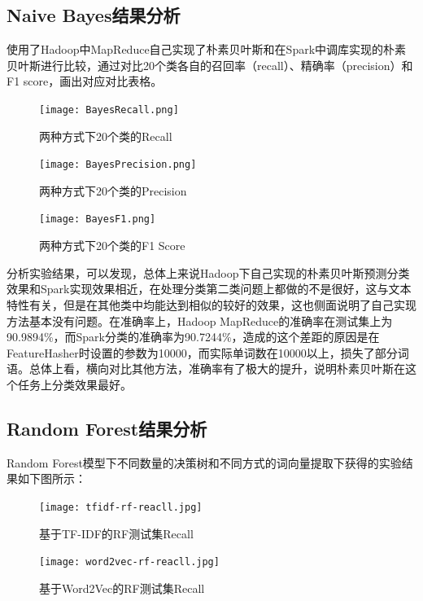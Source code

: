 \documentclass[lang=cn,11pt]{elegantpaper}
\begin{document}
\subsection{Naive Bayes结果分析}
使用了Hadoop中MapReduce自己实现了朴素贝叶斯和在Spark中调库实现的朴素贝叶斯进行比较，通过对比20个类各自的召回率（recall）、精确率（precision）和F1 score，画出对应对比表格。
\begin{figure}[H]
  \begin{minipage}[t]{0.5\linewidth}
  \centering
  \texttt{[image: BayesRecall.png]}
  \caption{两种方式下20个类的Recall \label{fig:BayesRecall}}
  \label{fig:side:a}
  \end{minipage}
  \begin{minipage}[t]{0.5\linewidth}
  \centering
  \texttt{[image: BayesPrecision.png]}
  \caption{两种方式下20个类的Precision \label{fig:BayesPrecision}}
  \label{fig:side:b}
  \end{minipage}
\end{figure} 

\begin{figure}[H]
	\centering
	\texttt{[image: BayesF1.png]}
	\caption{两种方式下20个类的F1 Score \label{fig:BayesF1}}
\end{figure}
分析实验结果，可以发现，总体上来说Hadoop下自己实现的朴素贝叶斯预测分类效果和Spark实现效果相近，在处理分类第二类问题上都做的不是很好，这与文本特性有关，但是在其他类中均能达到相似的较好的效果，这也侧面说明了自己实现方法基本没有问题。在准确率上，Hadoop MapReduce的准确率在测试集上为90.9894\%，而Spark分类的准确率为90.7244\%，造成的这个差距的原因是在FeatureHasher时设置的参数为10000，而实际单词数在10000以上，损失了部分词语。总体上看，横向对比其他方法，准确率有了极大的提升，说明朴素贝叶斯在这个任务上分类效果最好。

\subsection{Random Forest结果分析}
Random Forest模型下不同数量的决策树和不同方式的词向量提取下获得的实验结果如下图所示：\par
\begin{figure}[H]
  \begin{minipage}[t]{0.5\linewidth}
  \centering
  \texttt{[image: tfidf-rf-reacll.jpg]}
  \caption{基于TF-IDF的RF测试集Recall}
  \label{fig:side:a}
  \end{minipage}
  \begin{minipage}[t]{0.5\linewidth}
  \centering
  \texttt{[image: word2vec-rf-reacll.jpg]}
  \caption{基于Word2Vec的RF测试集Recall}
  \label{fig:side:b}
  \end{minipage}
  \end{figure}
\end{document}
